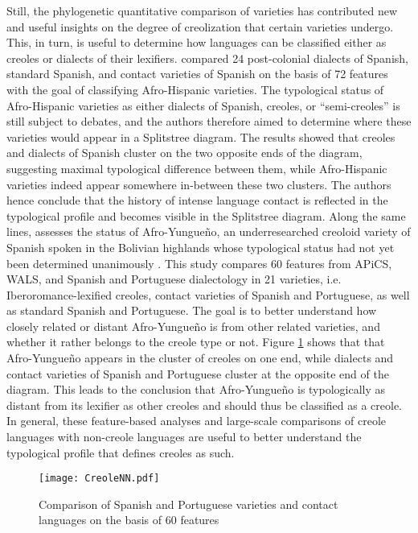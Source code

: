 \documentclass[output=paper,
modfonts
]{langscibook}
\begin{document}
Still, the phylogenetic quantitative comparison of varieties has contributed new and useful insights on the degree of creolization that certain varieties undergo. This, in turn, is useful to determine how languages can be classified either as creoles or dialects of their lexifiers. \cite{perezetal2017afro} compared 24 post-colonial dialects of Spanish, standard Spanish, and contact varieties of Spanish on the basis of 72 features with the goal of classifying Afro-Hispanic varieties. The typological status of Afro-Hispanic varieties as either dialects of Spanish, creoles, or “semi-creoles” \citep[cf.][]{holm2004languages} is still subject to debates, and the authors therefore aimed to determine where these varieties would appear in a Splitstree diagram. The results showed that creoles and dialects of Spanish cluster on the two opposite ends of the diagram, suggesting maximal typological difference between them, while Afro-Hispanic varieties indeed appear somewhere in-between these two clusters. The authors hence conclude that the history of intense language contact is reflected in the typological profile and becomes visible in the Splitstree diagram. Along the same lines, \cite{perez2017from} assesses the status of Afro-Yungueño, an underresearched creoloid variety of Spanish spoken in the Bolivian highlands whose typological status had not yet been determined unanimously \citep[cf.][]{perezetal2017afro}. This study compares 60 features from APiCS, WALS, and Spanish and Portuguese dialectology in 21 varieties, i.e. Iberoromance-lexified creoles, contact varieties of Spanish and Portuguese, as well as standard Spanish and Portuguese. The goal is to better understand how closely related or distant Afro-Yungueño is from other related varieties, and whether it rather belongs to the creole type or not. Figure \ref{CreoleNN} shows that that Afro-Yungueño appears in the cluster of creoles on one end, while dialects and contact varieties of Spanish and Portuguese cluster at the opposite end of the diagram. This leads to the conclusion that Afro-Yungueño is typologically as distant from its lexifier as other creoles and should thus be classified as a creole. In general, these feature-based analyses and large-scale comparisons of creole languages with non-creole languages are useful to better understand the typological profile that defines creoles as such.\\

\begin{figure}[h]
\texttt{[image: CreoleNN.pdf]}
\caption{Comparison of Spanish and Portuguese varieties and contact languages on the basis of 60 features} \label{CreoleNN}
\end{figure}
\end{document}
